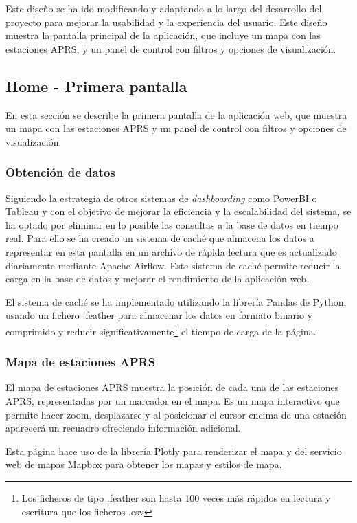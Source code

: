 \noindent Este diseño se ha ido modificando y adaptando a lo largo del desarrollo del proyecto para mejorar la usabilidad y la experiencia del usuario. Este diseño muestra la pantalla principal de la aplicación, que incluye un mapa con las estaciones APRS, y un panel de control con filtros y opciones de visualización.

\subsection{Home - Primera pantalla}
En esta sección se describe la primera pantalla de la aplicación web, que muestra un mapa con las estaciones APRS y un panel de control con filtros y opciones de visualización.

\subsubsection*{Obtención de datos}

Siguiendo la estrategia de otros sistemas de \textit{dashboarding} como PowerBI o Tableau y con el objetivo de mejorar la eficiencia y la escalabilidad del sistema, se ha optado por eliminar en lo posible las consultas a la base de datos en tiempo real. Para ello se ha creado un sistema de caché que almacena los datos a representar en esta pantalla en un archivo de rápida lectura que es actualizado diariamente mediante Apache Airflow. Este sistema de caché permite reducir la carga en la base de datos y mejorar el rendimiento de la aplicación web.

El sistema de caché se ha implementado utilizando la librería Pandas de Python, usando un fichero .feather para almacenar los datos en formato binario y comprimido y reducir significativamente\footnote{Los ficheros de tipo .feather son hasta 100 veces más rápidos en lectura y escritura que los ficheros .csv} el tiempo de carga de la página.

\subsubsection*{Mapa de estaciones APRS}

El mapa de estaciones APRS muestra la posición de cada una de las estaciones APRS, representadas por un marcador en el mapa. Es un mapa interactivo que permite hacer zoom, desplazarse y al posicionar el cursor encima de una estación aparecerá un recuadro ofreciendo información adicional.

Esta página hace uso de la librería Plotly para renderizar el mapa y del servicio web de mapas Mapbox para obtener los mapas y estilos de mapa.

